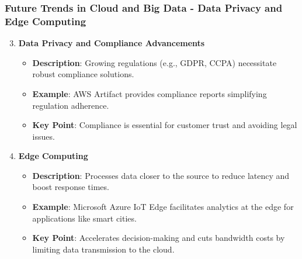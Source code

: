 \documentclass[aspectratio=169]{beamer}
\begin{document}
\begin{frame}[fragile]
    \frametitle{Future Trends in Cloud and Big Data - Data Privacy and Edge Computing}
    \begin{enumerate}
        \setcounter{enumi}{2} %
        \item \textbf{Data Privacy and Compliance Advancements}
            \begin{itemize}
                \item \textbf{Description}: Growing regulations (e.g., GDPR, CCPA) necessitate robust compliance solutions.
                \item \textbf{Example}: AWS Artifact provides compliance reports simplifying regulation adherence.
                \item \textbf{Key Point}: Compliance is essential for customer trust and avoiding legal issues.
            \end{itemize}

        \item \textbf{Edge Computing}
            \begin{itemize}
                \item \textbf{Description}: Processes data closer to the source to reduce latency and boost response times.
                \item \textbf{Example}: Microsoft Azure IoT Edge facilitates analytics at the edge for applications like smart cities.
                \item \textbf{Key Point}: Accelerates decision-making and cuts bandwidth costs by limiting data transmission to the cloud.
            \end{itemize}
    \end{enumerate}
\end{frame}
\end{document}
